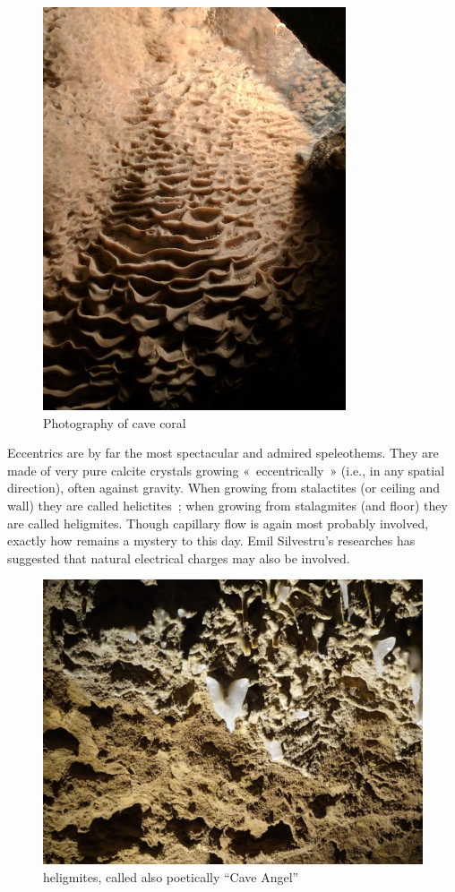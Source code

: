 \documentclass[draft, final]{report}
\begin{document}
\begin{figure}[!ht]
  \centering
  \includegraphics[scale=0.5]{LateX/Images/coral.jpg}
  \caption{Photography of cave coral\cite{cavecoral}}
\end{figure}
Eccentrics are by far the most spectacular and admired speleothems. They are made of very pure calcite crystals growing « eccentrically » (i.e., in any spatial direction), often against gravity. When growing from stalactites (or ceiling and wall) they are called helictites ; when growing from stalagmites (and floor) they are called heligmites. Though capillary flow is again most probably involved, exactly how remains a mystery to this day. Emil Silvestru's researches has suggested that natural electrical charges may also be involved.\\
\begin{figure}[!ht]
  \centering
  \includegraphics[scale=0.2]{LateX/Images/angel.jpg}
  \caption{heligmites, called also poetically ``Cave Angel''}
\end{figure}
\end{document}
